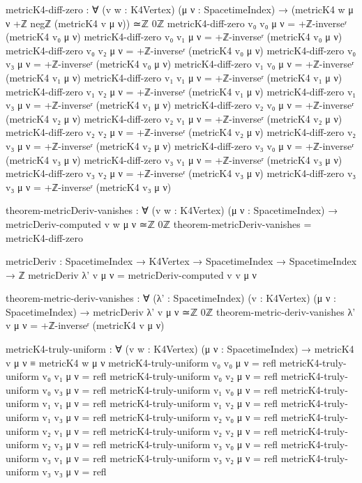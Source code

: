 \documentclass[11pt,a4paper]{book}
\begin{document}
\begin{code}
metricK4-diff-zero : ∀ (v w : K4Vertex) (μ ν : SpacetimeIndex) →
  (metricK4 w μ ν +ℤ negℤ (metricK4 v μ ν)) ≃ℤ 0ℤ
metricK4-diff-zero v₀ v₀ μ ν = +ℤ-inverseʳ (metricK4 v₀ μ ν)
metricK4-diff-zero v₀ v₁ μ ν = +ℤ-inverseʳ (metricK4 v₀ μ ν)
metricK4-diff-zero v₀ v₂ μ ν = +ℤ-inverseʳ (metricK4 v₀ μ ν)
metricK4-diff-zero v₀ v₃ μ ν = +ℤ-inverseʳ (metricK4 v₀ μ ν)
metricK4-diff-zero v₁ v₀ μ ν = +ℤ-inverseʳ (metricK4 v₁ μ ν)
metricK4-diff-zero v₁ v₁ μ ν = +ℤ-inverseʳ (metricK4 v₁ μ ν)
metricK4-diff-zero v₁ v₂ μ ν = +ℤ-inverseʳ (metricK4 v₁ μ ν)
metricK4-diff-zero v₁ v₃ μ ν = +ℤ-inverseʳ (metricK4 v₁ μ ν)
metricK4-diff-zero v₂ v₀ μ ν = +ℤ-inverseʳ (metricK4 v₂ μ ν)
metricK4-diff-zero v₂ v₁ μ ν = +ℤ-inverseʳ (metricK4 v₂ μ ν)
metricK4-diff-zero v₂ v₂ μ ν = +ℤ-inverseʳ (metricK4 v₂ μ ν)
metricK4-diff-zero v₂ v₃ μ ν = +ℤ-inverseʳ (metricK4 v₂ μ ν)
metricK4-diff-zero v₃ v₀ μ ν = +ℤ-inverseʳ (metricK4 v₃ μ ν)
metricK4-diff-zero v₃ v₁ μ ν = +ℤ-inverseʳ (metricK4 v₃ μ ν)
metricK4-diff-zero v₃ v₂ μ ν = +ℤ-inverseʳ (metricK4 v₃ μ ν)
metricK4-diff-zero v₃ v₃ μ ν = +ℤ-inverseʳ (metricK4 v₃ μ ν)

theorem-metricDeriv-vanishes : ∀ (v w : K4Vertex) (μ ν : SpacetimeIndex) →
                                metricDeriv-computed v w μ ν ≃ℤ 0ℤ
theorem-metricDeriv-vanishes = metricK4-diff-zero

metricDeriv : SpacetimeIndex → K4Vertex → SpacetimeIndex → SpacetimeIndex → ℤ
metricDeriv λ' v μ ν = metricDeriv-computed v v μ ν

theorem-metric-deriv-vanishes : ∀ (λ' : SpacetimeIndex) (v : K4Vertex) 
                                  (μ ν : SpacetimeIndex) →
                                metricDeriv λ' v μ ν ≃ℤ 0ℤ
theorem-metric-deriv-vanishes λ' v μ ν = +ℤ-inverseʳ (metricK4 v μ ν)

metricK4-truly-uniform : ∀ (v w : K4Vertex) (μ ν : SpacetimeIndex) →
  metricK4 v μ ν ≡ metricK4 w μ ν
metricK4-truly-uniform v₀ v₀ μ ν = refl
metricK4-truly-uniform v₀ v₁ μ ν = refl
metricK4-truly-uniform v₀ v₂ μ ν = refl
metricK4-truly-uniform v₀ v₃ μ ν = refl
metricK4-truly-uniform v₁ v₀ μ ν = refl
metricK4-truly-uniform v₁ v₁ μ ν = refl
metricK4-truly-uniform v₁ v₂ μ ν = refl
metricK4-truly-uniform v₁ v₃ μ ν = refl
metricK4-truly-uniform v₂ v₀ μ ν = refl
metricK4-truly-uniform v₂ v₁ μ ν = refl
metricK4-truly-uniform v₂ v₂ μ ν = refl
metricK4-truly-uniform v₂ v₃ μ ν = refl
metricK4-truly-uniform v₃ v₀ μ ν = refl
metricK4-truly-uniform v₃ v₁ μ ν = refl
metricK4-truly-uniform v₃ v₂ μ ν = refl
metricK4-truly-uniform v₃ v₃ μ ν = refl


\end{code}
\end{document}
